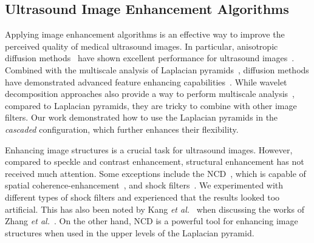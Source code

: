 





\subsection{Ultrasound Image Enhancement Algorithms}
Applying image enhancement algorithms is an effective way to improve the perceived quality of medical ultrasound images.
In particular, anisotropic diffusion methods~\cite{perona_scalespace_1990, weickert_anisotropic_1998} have shown excellent performance for ultrasound images~\cite{yongjianyu_speckle_2002, abd-elmoniem_realtime_2002, aja-fernandez_estimation_2006, krissian_oriented_2007, vegas-sanchez-ferrero_probabilisticdriven_2010, ramos-llorden_anisotropic_2015, mishra_edge_2018}.
Combined with the multiscale analysis of Laplacian pyramids~\cite{burt_laplacian_1983}, diffusion methods have demonstrated advanced feature enhancing capabilities~\cite{zhang_multiscale_2006, zhang_nonlinear_2007, kang_new_2016}.
While wavelet decomposition approaches also provide a way to perform multiscale analysis~\cite{xulizong_speckle_1998, xiaohuihao_novel_1999, pizurica_versatile_2003, yongyue_nonlinear_2006}, compared to Laplacian pyramids, they are tricky to combine with other image filters.
Our work demonstrated how to use the Laplacian pyramids in the \textit{cascaded} configuration, which further enhances their flexibility.

Enhancing image structures is a crucial task for ultrasound images.
However, compared to speckle and contrast enhancement, structural enhancement has not received much attention.
Some exceptions include the NCD~\cite{abd-elmoniem_realtime_2002}, which is capable of spatial coherence-enhancement~\cite{weickert_coherenceenhancing_1999}, and shock filters~\cite{zhang_multiscale_2006, kang_new_2016}.
We experimented with different types of shock filters and experienced that the results looked too artificial.
This has also been noted by Kang \textit{et al.}~\cite{kang_new_2016} when discussing the works of Zhang \textit{et al.}~\cite{zhang_multiscale_2006}.
On the other hand, NCD is a powerful tool for enhancing image structures when used in the upper levels of the Laplacian pyramid.


